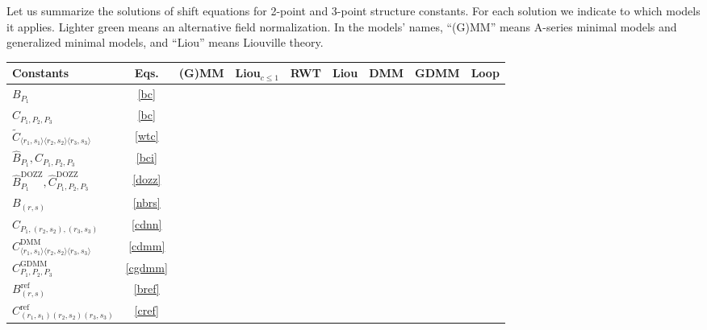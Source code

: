 \documentclass[12pt, a4paper]{article}
\theoremstyle{break}
\begin{document}
Let us summarize the solutions of shift equations for 2-point and 3-point structure constants. For each solution we indicate to which models it applies. Lighter green means an alternative field normalization. In the models' names, ``(G)MM'' means A-series minimal models and generalized minimal models, and ``Liou'' means Liouville theory. 
\begin{center}
\begin{tabular}{|l|c|c|c|c|c|c|c|c|}
\hline 
 Constants & Eqs. & (G)MM & Liou$_{c\leq 1}$ & RWT & Liou & DMM & GDMM & Loop 
 \\
 \hline
  $B_{P_1}$ & \eqref{bc} & \cellcolor{green} & \cellcolor{green} & \cellcolor{green} &  & \cellcolor{green} & \cellcolor{green} & \cellcolor{green} 
  \\
  \hline 
  $C_{P_1,P_2,P_3}$& \eqref{bc} & \cellcolor{green} & \cellcolor{green} & \cellcolor{green} &  &  &  & \cellcolor{green} 
  \\
  \hline 
  $\widetilde{C}_{\langle r_1,s_1\rangle\langle r_2,s_2\rangle\langle r_3,s_3\rangle}$ & \eqref{wtc} & \cellcolor{green!20} & & & & & & 
  \\
  \hline 
  $\hat{B}_{P_1},\hat{C}_{P_1,P_2,P_3}$ &  \eqref{bci} & & & & \cellcolor{green} & & & 
  \\
  \hline 
  $\hat{B}^\text{DOZZ}_{P_1},\hat{C}^\text{DOZZ}_{P_1,P_2,P_3}$ & \eqref{dozz} & & & & \cellcolor{green!20} & & &
  \\
  \hline 
  $B_{(r,s)}$ & \eqref{nbrs} & & & & & \cellcolor{green} & \cellcolor{green} & 
  \\
  \hline 
  $C_{P_1,(r_2,s_2),(r_3,s_3)}$ & \eqref{cdnn} & & & & & \cellcolor{green} & \cellcolor{green} & 
  \\
  \hline 
  $C^\text{DMM}_{\langle r_1,s_1\rangle\langle r_2,s_2\rangle\langle r_3,s_3\rangle}$ & \eqref{cdmm} &
  & & & & \cellcolor{green} & & 
  \\
  \hline 
  $C^\text{GDMM}_{P_1,P_2,P_3}$ & \eqref{cgdmm} &
  & & & & & \cellcolor{green} & 
  \\
  \hline 
  $B^\text{ref}_{(r,s)}$ & \eqref{bref} & & & & & & & \cellcolor{green}
  \\
  \hline 
  $C^\text{ref}_{(r_1,s_1)(r_2,s_2)(r_3,s_3)}$ & \eqref{cref} & & & & & & & \cellcolor{green}
  \\
  \hline 
\end{tabular}
\end{center}

\end{document}
